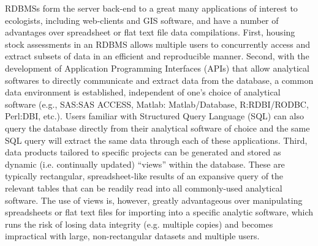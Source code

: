 \documentclass[letterpaper,review,authoryear,12pt]{elsarticle}
\begin{document}
RDBMSs form the server back-end to a great many applications of
interest to ecologists, including web-clients and GIS software, and
have a number of advantages over spreadsheet or flat text file data
compilations.  First, housing stock assessments in an RDBMS allows
multiple users to concurrently access and extract subsets of data in
an efficient and reproducible manner. Second, with the development of
Application Programming Interfaces (APIs) that allow analytical
softwares to directly communicate and extract data from the database,
a common data environment is established, independent of one's choice
of analytical software (e.g., SAS:SAS ACCESS, Matlab: Matlab/Database,
R:RDBI/RODBC, Perl:DBI, etc.).  Users familiar with Structured Query
Language (SQL) can also query the database directly from their
analytical software of choice and the same SQL query will extract the
same data through each of these applications.  Third, data products
tailored to specific projects can be generated and stored as dynamic
(i.e. continually updated) ``views'' within the database.  These are
typically rectangular, spreadsheet-like results of an expansive query
of the relevant tables that can be readily read into all commonly-used
analytical software.  The use of views is, however, greatly
advantageous over manipulating spreadsheets or flat text files for
importing into a specific analytic software, which runs the risk of
losing data integrity (e.g. multiple copies) and becomes impractical
with large, non-rectangular datasets and multiple users.
\end{document}
